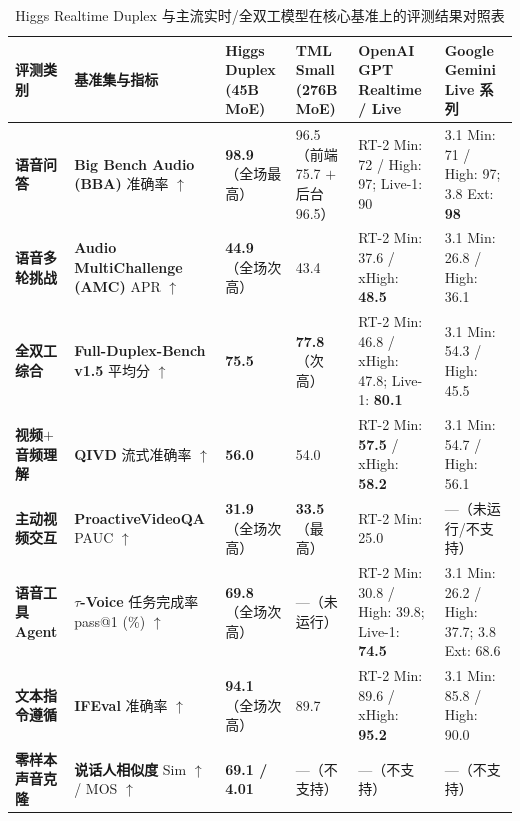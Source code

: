 \documentclass[a4paper]{article}
\begin{document}
\begin{table}[H]
\centering
\small
\caption{Higgs Realtime Duplex 与主流实时/全双工模型在核心基准上的评测结果对照表}
\begin{tabular}{p{2.0cm}p{2.4cm}p{1.8cm}p{2.1cm}p{2.4cm}p{2.3cm}}
\toprule
\textbf{评测类别} & \textbf{基准集与指标} & \textbf{Higgs Duplex (45B MoE)} & \textbf{TML Small (276B MoE)} & \textbf{OpenAI GPT Realtime / Live} & \textbf{Google Gemini Live 系列} \\
\midrule
\textbf{语音问答} & \textbf{Big Bench Audio (BBA)} 准确率 $\uparrow$ & \textbf{98.9}（全场最高） & 96.5（前端 75.7 $+$ 后台 96.5） & RT-2 Min: 72 / High: 97; Live-1: 90 & 3.1 Min: 71 / High: 97; 3.8 Ext: \textbf{98} \\
\textbf{语音多轮挑战} & \textbf{Audio Multi\-Challenge (AMC)} APR $\uparrow$ & \textbf{44.9}（全场次高） & 43.4 & RT-2 Min: 37.6 / xHigh: \textbf{48.5} & 3.1 Min: 26.8 / High: 36.1 \\
\textbf{全双工综合} & \textbf{Full-Duplex-Bench v1.5} 平均分 $\uparrow$ & \textbf{75.5} & \textbf{77.8}（次高） & RT-2 Min: 46.8 / xHigh: 47.8; Live-1: \textbf{80.1} & 3.1 Min: 54.3 / High: 45.5 \\
\textbf{视频$+$音频理解} & \textbf{QIVD} 流式准确率 $\uparrow$ & \textbf{56.0} & 54.0 & RT-2 Min: \textbf{57.5} / xHigh: \textbf{58.2} & 3.1 Min: 54.7 / High: 56.1 \\
\textbf{主动视频交互} & \textbf{Proactive\-VideoQA} PAUC $\uparrow$ & \textbf{31.9}（全场次高） & \textbf{33.5}（最高） & RT-2 Min: 25.0 & —（未运行/不支持） \\
\textbf{语音工具 Agent} & \textbf{$\tau$-Voice} 任务完成率 pass@1 (\%) $\uparrow$ & \textbf{69.8}（全场次高） & —（未运行） & RT-2 Min: 30.8 / High: 39.8; Live-1: \textbf{74.5} & 3.1 Min: 26.2 / High: 37.7; 3.8 Ext: 68.6 \\
\textbf{文本指令遵循} & \textbf{IFEval} 准确率 $\uparrow$ & \textbf{94.1}（全场次高） & 89.7 & RT-2 Min: 89.6 / xHigh: \textbf{95.2} & 3.1 Min: 85.8 / High: 90.0 \\
\textbf{零样本声音克隆} & \textbf{说话人相似度} Sim $\uparrow$ / MOS $\uparrow$ & \textbf{69.1 / 4.01} & —（不支持） & —（不支持） & —（不支持） \\
\bottomrule
\end{tabular}
\end{table}
\end{document}
